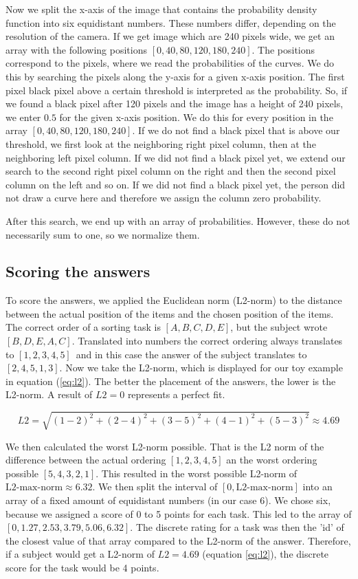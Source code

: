 \documentclass[../main/main.tex]{subfiles}
\begin{document}
	Now we split the x-axis of the image that contains the probability density function into six equidistant numbers. These numbers differ, depending on the resolution of the camera. If we get image which are 240 pixels wide, we get an array with the following positions $[0, 40, 80, 120, 180, 240]$. The positions correspond to the pixels, where we read the probabilities of the curves. We do this by searching the pixels along the y-axis for a given x-axis position. The first pixel black pixel above a certain threshold is interpreted as the probability. So, if we found a black pixel after 120 pixels and the image has a height of 240 pixels, we enter $0.5$ for the given x-axis position. We do this for every position in the array $[0, 40, 80, 120, 180, 240]$. If we do not find a black pixel that is above our threshold, we first look at the neighboring right pixel column, then at the neighboring left pixel column. If we did not find a black pixel yet, we extend our search to the second right pixel column on the right and then the second pixel column on the left and so on. If we did not find a black pixel yet, the person did not draw a curve here and therefore we assign the column zero probability.
	
	After this search, we end up with an array of probabilities. However, these do not necessarily sum to one, so we normalize them.
	
	\subsection{Scoring the answers}
	
	To score the answers, we applied the Euclidean norm (L2-norm) to the distance between the actual position of the items and the chosen position of the items. The correct order of a sorting task is $[A, B, C, D, E]$, but the subject wrote $[B, D, E, A, C]$. Translated into numbers the correct ordering always translates to $[1, 2, 3, 4, 5]$ and in this case the answer of the subject translates to $[2, 4, 5, 1, 3]$. Now we take the L2-norm, which is displayed for our toy example in equation (\ref{eq:l2}). The better the placement of the answers, the lower is the L2-norm. A result of $L2 = 0$ represents a perfect fit.
	
	\begin{equation}
		\label{eq:l2}
		L2 = \sqrt{(1-2)^2 + (2-4)^2 + (3-5)^2 + (4-1)^2  + (5 - 3)^2} \approx 4.69
	\end{equation}
	
	We then calculated the worst L2-norm possible. That is the L2 norm of the difference between the actual ordering $[1, 2, 3, 4, 5]$ an the worst ordering possible $[5, 4, 3, 2, 1]$. This resulted in the worst possible L2-norm of $\text{L2-max-norm} \approx 6.32$. We then split the interval of $[0, \text{L2-max-norm}]$ into an array of a fixed amount of equidistant numbers (in our case 6). We chose six, because we assigned a score of 0 to 5 points for each task. This led to the array of $[0, 1.27, 2.53, 3.79, 5.06, 6.32]$. The discrete rating for a task was then the 'id' of the closest value of that array compared to the L2-norm of the answer. Therefore, if a subject would get a L2-norm of $L2 = 4.69$ (equation \ref{eq:l2}), the discrete score for the task would be 4 points.
	
\end{document}
